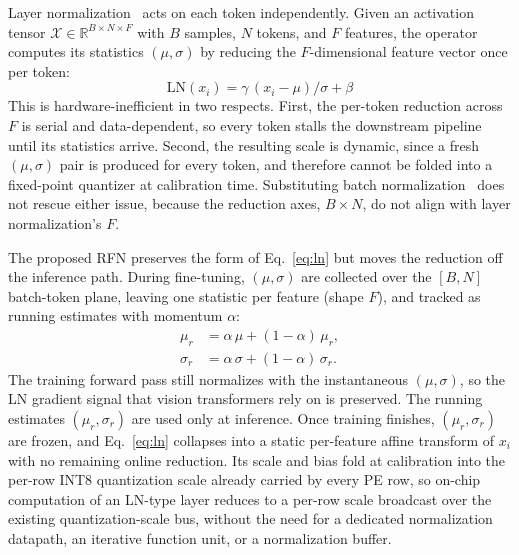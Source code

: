 \documentclass[lettersize,journal]{IEEEtran}
\begin{document}
Layer normalization~\cite{ba2016layernorm} acts on each token independently. Given an activation tensor $\mathcal{X}\in\mathbb{R}^{B\times N\times F}$ with $B$ samples, $N$ tokens, and $F$ features, the operator computes its statistics $(\mu, \sigma)$ by reducing the $F$-dimensional feature vector once per token:
\begin{equation}
    \mathrm{LN}(x_{i})=\gamma\,(x_{i}-\mu)/\sigma+\beta
    \label{eq:ln}
\end{equation}
This is hardware-inefficient in two respects. First, the per-token reduction across $F$ is serial and data-dependent, so every token stalls the downstream pipeline until its statistics arrive. Second, the resulting scale is dynamic, since a fresh $(\mu, \sigma)$ pair is produced for every token, and therefore cannot be folded into a fixed-point quantizer at calibration time. Substituting batch normalization~\cite{Ioffe2015BatchNorm} does not rescue either issue, because the reduction axes, $B\times N$, do not align with layer normalization's $F$.

The proposed RFN preserves the form of Eq.~\eqref{eq:ln} but moves the reduction off the inference path. During fine-tuning, $(\mu, \sigma)$ are collected over the $[B, N]$ batch-token plane, leaving one statistic per feature (shape $F$), and tracked as running estimates with momentum $\alpha$:
\begin{align}
    \mu_{r} &= \alpha\,\mu + (1-\alpha)\,\mu_{r}, \\
    \sigma_{r} &= \alpha\,\sigma + (1-\alpha)\,\sigma_{r}.
\end{align}
The training forward pass still normalizes with the instantaneous $(\mu, \sigma)$, so the LN gradient signal that vision transformers rely on is preserved. The running estimates $(\mu_{r}, \sigma_{r})$ are used only at inference. Once training finishes, $(\mu_{r}, \sigma_{r})$ are frozen, and Eq.~\eqref{eq:ln} collapses into a static per-feature affine transform of $x_{i}$ with no remaining online reduction. Its scale and bias fold at calibration into the per-row INT8 quantization scale already carried by every PE row, so on-chip computation of an LN-type layer reduces to a per-row scale broadcast over the existing quantization-scale bus, without the need for a dedicated normalization datapath, an iterative function unit, or a normalization buffer.
\end{document}
